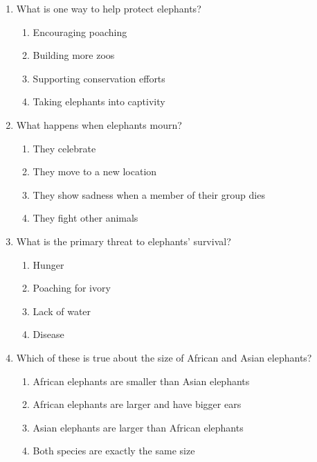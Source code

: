 \documentclass[12pt]{article}
\begin{document}
\begin{enumerate}
    \vspace{0.5cm}

    \item What is one way to help protect elephants?

    \begin{enumerate}[label=\Alph*.]
        \item Encouraging poaching
        \item Building more zoos
        \item Supporting conservation efforts
        \item Taking elephants into captivity
    \end{enumerate}
    
    \vspace{0.5cm}

    \item What happens when elephants mourn?

    \begin{enumerate}[label=\Alph*.]
        \item They celebrate
        \item They move to a new location
        \item They show sadness when a member of their group dies
        \item They fight other animals
    \end{enumerate}
    
    \vspace{0.5cm}

    \item What is the primary threat to elephants' survival?

    \begin{enumerate}[label=\Alph*.]
        \item Hunger
        \item Poaching for ivory
        \item Lack of water
        \item Disease
    \end{enumerate}
    
    \vspace{0.5cm}

    \item Which of these is true about the size of African and Asian elephants?

    \begin{enumerate}[label=\Alph*.]
        \item African elephants are smaller than Asian elephants
        \item African elephants are larger and have bigger ears
        \item Asian elephants are larger than African elephants
        \item Both species are exactly the same size
    \end{enumerate}
    

\end{enumerate}
\end{document}
